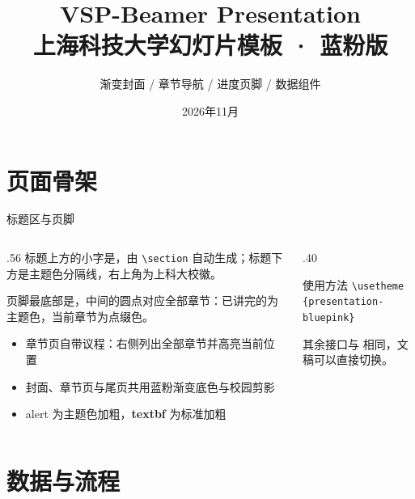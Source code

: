 \documentclass[aspectratio=169,10pt]{beamer}
\title[VSP-Beamer Presentation]{VSP-Beamer Presentation\\上海科技大学幻灯片模板 · 蓝粉版}
\subtitle{渐变封面 / 章节导航 / 进度页脚 / 数据组件}
\date{2026年11月}
\begin{document}
\VSPtitleframe

\section{页面骨架}

\begin{frame}[t]{标题区与页脚}
\begin{columns}[T,onlytextwidth]
  \begin{column}{.56\textwidth}
    标题上方的小字是，由 \texttt{\textbackslash section} 自动生成；标题下方是主题色分隔线，右上角为上科大校徽。

    页脚最底部是，中间的圆点对应全部章节：已讲完的为主题色，当前章节为点缀色。

    \begin{itemize}
      \item 章节页自带议程：右侧列出全部章节并高亮当前位置
      \item 封面、章节页与尾页共用蓝粉渐变底色与校园剪影
      \item \alert{alert} 为主题色加粗，\textbf{textbf} 为标准加粗
    \end{itemize}
  \end{column}
  \begin{column}{.40\textwidth}
    \begin{vspquote}{使用方法}
      \texttt{\textbackslash usetheme}\\\texttt{\{presentation-bluepink\}}

      其余接口与  相同，文稿可以直接切换。
    \end{vspquote}
      
  \end{column}
\end{columns}
\end{frame}

\section{数据与流程}
\end{document}
